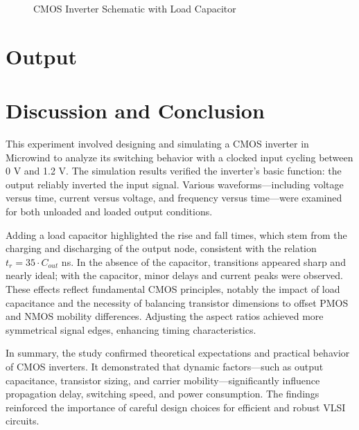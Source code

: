 \documentclass[12pt]{article}
\begin{document}
\begin{figure}[H]
\begin{minipage}{0.48\textwidth}
        \caption{CMOS Inverter Schematic with Load Capacitor}
    \end{minipage}
\end{figure}

\section*{Output}



\section*{Discussion and Conclusion}
This experiment involved designing and simulating a CMOS inverter in Microwind to analyze its switching behavior with a clocked input cycling between 0 V and 1.2 V. The simulation results verified the inverter’s basic function: the output reliably inverted the input signal. Various waveforms—including voltage versus time, current versus voltage, and frequency versus time—were examined for both unloaded and loaded output conditions.

Adding a load capacitor highlighted the rise and fall times, which stem from the charging and discharging of the output node, consistent with the relation $t_r = 35 \cdot C_{out}$ ns. In the absence of the capacitor, transitions appeared sharp and nearly ideal; with the capacitor, minor delays and current peaks were observed. These effects reflect fundamental CMOS principles, notably the impact of load capacitance and the necessity of balancing transistor dimensions to offset PMOS and NMOS mobility differences. Adjusting the aspect ratios achieved more symmetrical signal edges, enhancing timing characteristics.

In summary, the study confirmed theoretical expectations and practical behavior of CMOS inverters. It demonstrated that dynamic factors—such as output capacitance, transistor sizing, and carrier mobility—significantly influence propagation delay, switching speed, and power consumption. The findings reinforced the importance of careful design choices for efficient and robust VLSI circuits.


\renewcommand{\bibname}{References}

\end{document}
